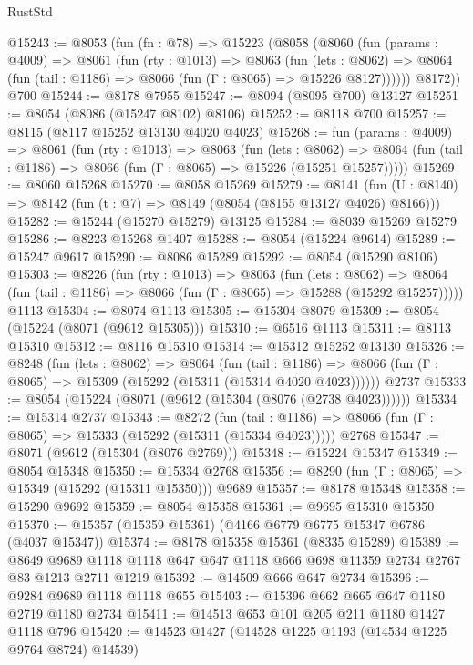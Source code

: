 \begin{lexlean}{RustStd}
\begin{coremodule}
@15243 := @8053
    (fun (fn : @78) =>
    @15223
      (@8058
        (@8060
          (fun (params : @4009) =>
          @8061
            (fun (rty : @1013) =>
            @8063
              (fun (lets : @8062) =>
              @8064 (fun (tail : @1186) => @8066 (fun (Γ : @8065) => @15226 @8127))))))
        @8172))
    @700
@15244 := @8178 @7955
@15247 := @8094 (@8095 @700) @13127
@15251 := @8054 (@8086 (@15247 @8102) @8106)
@15252 := @8118 @700
@15257 := @8115 (@8117 @15252 @13130 @4020 @4023)
@15268 := fun (params : @4009) =>
  @8061
    (fun (rty : @1013) =>
    @8063
      (fun (lets : @8062) =>
      @8064 (fun (tail : @1186) => @8066 (fun (Γ : @8065) => @15226 (@15251 @15257)))))
@15269 := @8060 @15268
@15270 := @8058 @15269
@15279 := @8141
    (fun (U : @8140) => @8142 (fun (t : @7) => @8149 (@8054 (@8155 @13127 @4026) @8166)))
@15282 := @15244 (@15270 @15279) @13125
@15284 := @8039 @15269 @15279
@15286 := @8223 @15268 @1407
@15288 := @8054 (@15224 @9614)
@15289 := @15247 @9617
@15290 := @8086 @15289
@15292 := @8054 (@15290 @8106)
@15303 := @8226
    (fun (rty : @1013) =>
    @8063
      (fun (lets : @8062) =>
      @8064 (fun (tail : @1186) => @8066 (fun (Γ : @8065) => @15288 (@15292 @15257)))))
    @1113
@15304 := @8074 @1113
@15305 := @15304 @8079
@15309 := @8054 (@15224 (@8071 (@9612 @15305)))
@15310 := @6516 @1113
@15311 := @8113 @15310
@15312 := @8116 @15310
@15314 := @15312 @15252 @13130
@15326 := @8248
    (fun (lets : @8062) =>
    @8064
      (fun (tail : @1186) =>
      @8066 (fun (Γ : @8065) => @15309 (@15292 (@15311 (@15314 @4020 @4023))))))
    @2737
@15333 := @8054 (@15224 (@8071 (@9612 (@15304 (@8076 (@2738 @4023))))))
@15334 := @15314 @2737
@15343 := @8272
    (fun (tail : @1186) => @8066 (fun (Γ : @8065) => @15333 (@15292 (@15311 (@15334 @4023)))))
    @2768
@15347 := @8071 (@9612 (@15304 (@8076 @2769)))
@15348 := @15224 @15347
@15349 := @8054 @15348
@15350 := @15334 @2768
@15356 := @8290 (fun (Γ : @8065) => @15349 (@15292 (@15311 @15350))) @9689
@15357 := @8178 @15348
@15358 := @15290 @9692
@15359 := @8054 @15358
@15361 := @9695 @15310 @15350
@15370 := @15357 (@15359 @15361) (@4166 @6779 @6775 @15347 @6786 (@4037 @15347))
@15374 := @8178 @15358 @15361 (@8335 @15289)
@15389 := @8649 @9689 @1118 @1118 @647 @647 @1118 @666 @698 @11359 @2734 @2767 @83 @1213 @2711 @1219
@15392 := @14509 @666 @647 @2734
@15396 := @9284 @9689 @1118 @1118 @655
@15403 := @15396 @662 @665 @647 @1180 @2719 @1180 @2734
@15411 := @14513 @653 @101 @205 @211 @1180 @1427 @1118 @796
@15420 := @14523 @1427 (@14528 @1225 @1193 (@14534 @1225 @9764 @8724) @14539)

\end{coremodule}
\end{lexlean}
